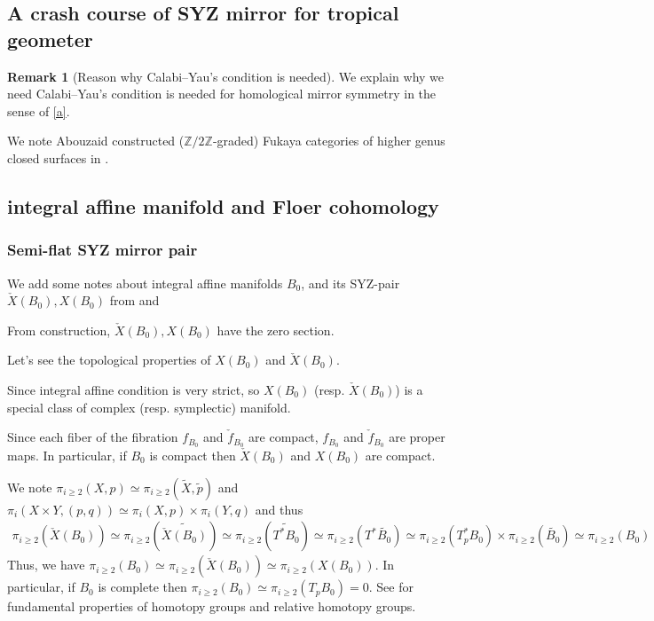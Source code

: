 \documentclass[a4paper,dvipdfmx,reqno,12pt]{amsart}
\theoremstyle{definition}
\newtheorem{Rmk}[Thm]{Remark}
\newcommand{\Z}{\mathbb{Z}}%
\numberwithin{equation}{section}
\begin{document}
\subsection{A crash course of SYZ mirror for tropical 
geometer}

\begin{Rmk}[{Reason why Calabi--Yau's condition is needed}]

We explain why we need Calabi--Yau's condition is needed for
homological mirror symmetry in the sense of \cref{a}.

We note Abouzaid constructed ($\Z/2\Z$-graded)
Fukaya categories of higher genus closed surfaces in
\cite{MR2383898}. 
\end{Rmk}

\subsection{integral affine manifold and Floer cohomology}

\subsubsection{Semi-flat SYZ mirror pair}

We add some notes about integral affine manifolds $B_0$, and its SYZ-pair $\check{X}(B_0), X(B_0)$ from \cite[Chapter 6]{aspinwallDirichletBranesMirror2009} and \cite{MR2737696,MR3079343}



From construction, $\check{X}(B_0), X(B_0)$ have the zero section.

Let's see the topological properties of $X(B_0)$ and $\check{X}(B_0)$.

Since integral affine condition is very strict, so $X(B_0)$ (resp. $\check{X}(B_0)$) is a special class of complex (resp. symplectic) manifold.

Since each fiber of the fibration $f_{B_0}$ and $\check{f}_{B_0}$ are compact, $f_{B_0}$ and $\check{f}_{B_0}$ are proper maps. In particular, if $B_0$ is compact then $\check{X}(B_0)$ and $X(B_0)$ are compact.



We note $\pi_{i\geq 2}(X,p)\simeq \pi_{i\geq 2}(\widetilde{X},\tilde{p})$ and $\pi_{i}(X\times Y,(p,q))\simeq \pi_i(X,p)\times \pi_i(Y,q)$ and thus
\begin{align}
  \pi_{i\geq 2}(\check{X}(B_0))\simeq \pi_{i\geq 2}(\widetilde{\check{X}(B_0)})\simeq \pi_{i\geq 2}(\widetilde{T^{*}B_0})\simeq \pi_{i\geq 2}(T^{*}\widetilde{B_0})\simeq  \pi_{i\geq 2}(T_p^* B_0)\times \pi_{i\geq 2}(\widetilde{B_0})\simeq \pi_{i\geq 2}(B_0)
\end{align}
Thus, we have $\pi_{i\geq 2}(B_0)\simeq \pi_{i\geq 2}(\check{X}(B_0))\simeq \pi_{i\geq 2}(X(B_0))$. In particular, if $B_0$ is complete then $\pi_{i\geq 2}(B_0)\simeq \pi_{i\geq 2}(T_{p}B_0)=0$. See \cite[Chapter 4]{hatcherAlgebraicTopology2002a} for fundamental properties of homotopy groups and relative homotopy groups.
\end{document}
